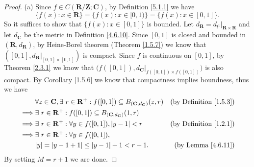 \begin{proof}{(a)}
    Since \(f \in C(\mathbf{R} / \mathbf{Z} ; \mathbf{C})\), by Definition \ref{5.1.1} we have
    \[
        \big\{f(x) : x \in \mathbf{R}\big\} = \big\{f(x) : x \in [0, 1)\big\} = \big\{f(x) : x \in [0, 1]\big\}.
    \]
    So it suffices to show that \(\{f(x) : x \in [0, 1]\}\) is bounded.
    Let \(d_{\mathbf{R}} = d_{l^1}|_{\mathbf{R} \times \mathbf{R}}\) and let \(d_{\mathbf{C}}\) be the metric in Definition \ref{4.6.10}.
    Since \([0, 1]\) is closed and bounded in \((\mathbf{R}, d_{\mathbf{R}})\), by Heine-Borel theorem (Theorem \ref{1.5.7}) we know that \(([0, 1], d_{\mathbf{R}}|_{[0, 1] \times [0, 1]})\) is compact.
    Since \(f\) is continuous on \([0, 1]\), by Theorem \ref{2.3.1} we know that \(\big(f([0, 1]), d_{\mathbf{C}}|_{f([0, 1]) \times f([0, 1])}\big)\) is also compact.
    By Corollary \ref{1.5.6} we know that compactness implies boundness, thus we have
    \begin{align*}
                 & \forall z \in \mathbf{C}, \exists\ r \in \mathbf{R}^+ : f([0, 1]) \subseteq B_{(\mathbf{C}, d_{\mathbf{C}})}(z, r) & \text{(by Definition \ref{1.5.3})} \\
        \implies & \exists\ r \in \mathbf{R}^+ : f([0, 1]) \subseteq B_{(\mathbf{C}, d_{\mathbf{C}})}(1, r)                                                                \\
        \implies & \exists\ r \in \mathbf{R}^+ : \forall y \in f([0, 1]), \abs*{y - 1} < r                                            & \text{(by Definition \ref{1.2.1})} \\
        \implies & \exists\ r \in \mathbf{R}^+ : \forall y \in f([0, 1]),                                                                                                  \\
                 & \abs*{y} = \abs*{y - 1 + 1} \leq \abs*{y - 1} + 1 < r + 1.                                                         & \text{(by Lemma \ref{4.6.11})}
    \end{align*}
    By setting \(M = r + 1\) we are done.
\end{proof}

